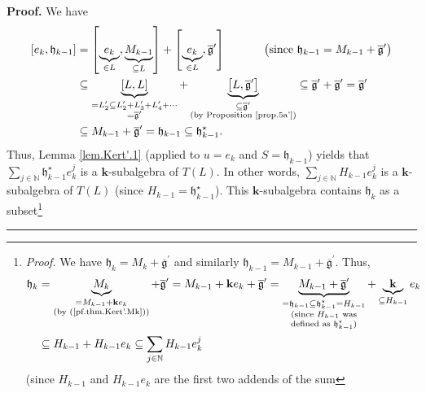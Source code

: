 \documentclass[numbers=enddot,12pt,final,onecolumn,notitlepage]{scrartcl}%
\theoremstyle{definition}
\newenvironment{proof}[1][Proof]{\noindent\textbf{#1.} }{\ \rule{0.5em}{0.5em}}
\let\sumnonlimits\sum
\renewcommand{\sum}{\sumnonlimits\limits}
\begin{document}
\begin{proof}
We have%
\begin{align*}
\left[  e_{k},\mathfrak{h}_{k-1}\right]   &  =\left[  \underbrace{e_{k}}_{\in
L},\underbrace{M_{k-1}}_{\subseteq L}\right]  +\left[  \underbrace{e_{k}}_{\in
L},\overline{\mathfrak{g}}^{\prime}\right]  \ \ \ \ \ \ \ \ \ \ \left(
\text{since }\mathfrak{h}_{k-1}=M_{k-1}+\overline{\mathfrak{g}}^{\prime
}\right) \\
&  \subseteq\underbrace{\left[  L,L\right]  }_{\substack{=L_{2}^{\prime
}\subseteq L_{2}^{\prime}+L_{3}^{\prime}+L_{4}^{\prime}+\cdots\\=\overline
{\mathfrak{g}}^{\prime}}}+\underbrace{\left[  L,\overline{\mathfrak{g}%
}^{\prime}\right]  }_{\substack{\subseteq\overline{\mathfrak{g}}^{\prime
}\\\text{(by Proposition \ref{prop.5a'})}}}\subseteq\overline{\mathfrak{g}%
}^{\prime}+\overline{\mathfrak{g}}^{\prime}=\overline{\mathfrak{g}}^{\prime}\\
&  \subseteq M_{k-1}+\overline{\mathfrak{g}}^{\prime}=\mathfrak{h}%
_{k-1}\subseteq\mathfrak{h}_{k-1}^{\star}.
\end{align*}
Thus, Lemma \ref{lem.Kert'.1} (applied to $u=e_{k}$ and $S=\mathfrak{h}_{k-1}%
$) yields that $\sum_{j\in\mathbb{N}}\mathfrak{h}_{k-1}^{\star}e_{k}^{j}$ is a
$\mathbf{k}$-subalgebra of $T\left(  L\right)  $. In other words, $\sum
_{j\in\mathbb{N}}H_{k-1}e_{k}^{j}$ is a $\mathbf{k}$-subalgebra of $T\left(
L\right)  $ (since $H_{k-1}=\mathfrak{h}_{k-1}^{\star}$). This $\mathbf{k}%
$-subalgebra contains $\mathfrak{h}_{k}$ as a subset\footnote{\textit{Proof.}
We have $\mathfrak{h}_{k}=M_{k}+\overline{\mathfrak{g}}^{\prime}$ and
similarly $\mathfrak{h}_{k-1}=M_{k-1}+\overline{\mathfrak{g}}^{\prime}$. Thus,%
\begin{align*}
\mathfrak{h}_{k}  &  =\underbrace{M_{k}}_{\substack{=M_{k-1}+\mathbf{k}%
e_{k}\\\text{(by (\ref{pf.thm.Kert'.Mk}))}}}+\overline{\mathfrak{g}}^{\prime
}=M_{k-1}+\mathbf{k}e_{k}+\overline{\mathfrak{g}}^{\prime}=\underbrace{M_{k-1}%
+\overline{\mathfrak{g}}^{\prime}}_{\substack{=\mathfrak{h}_{k-1}%
\subseteq\mathfrak{h}_{k-1}^{\star}=H_{k-1}\\\text{(since }H_{k-1}\text{
was}\\\text{defined as }\mathfrak{h}_{k-1}^{\star}\text{)}}%
}+\underbrace{\mathbf{k}}_{\subseteq H_{k-1}}e_{k}\\
&  \subseteq H_{k-1}+H_{k-1}e_{k}\subseteq\sum_{j\in\mathbb{N}}H_{k-1}%
e_{k}^{j}%
\end{align*}
(since $H_{k-1}$ and $H_{k-1}e_{k}$ are the first two addends of the sum
}
\end{proof}
\end{document}
